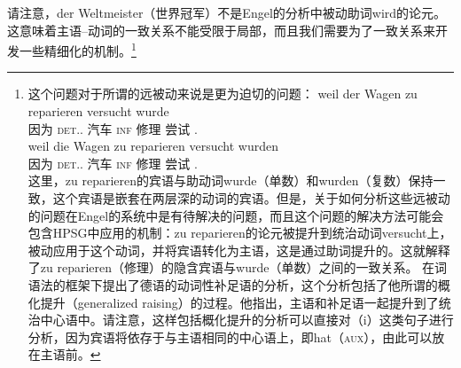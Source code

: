请注意，der Weltmeister（世界冠军）不是Engel的分析中被动助词wird的论元。这意味着主语--动词的一致关系不能受限于局部，而且我们需要为了一致关系来开发一些精细化的机制。\footnote{%
这个问题对于所谓的远被动来说是更为迫切的问题：
\eal
\ex
\gll weil der Wagen zu reparieren versucht wurde\\
     因为 \textsc{det}.\sg.\nom{} 汽车 \textsc{inf} 修理 尝试 \passivepst.\sg\\
\ex
\gll weil die Wagen zu reparieren versucht wurden\\
     因为 \textsc{det}.\pl.\nom{} 汽车 \textsc{inf} 修理 尝试 \passivepst.\pl\\
\zl
这里，zu reparieren的宾语与助动词wurde（单数）和wurden（复数）保持一致，这个宾语是嵌套在两层深的动词的宾语。但是，关于如何分析这些远被动的问题在Engel的系统中是有待解决的问题，而且这个问题的解决方法可能会包含HPSG中应用的机制：zu reparieren的论元被提升到统治动词versucht上，被动应用于这个动词，并将宾语转化为主语，这是通过助词提升的。这就解释了zu reparieren（修理）的隐含宾语与wurde（单数）之间的一致关系。 \citet{Hudson97a}在词语法的框架下提出了德语的动词性补足语的分析，这个分析包括了他所谓的概化提升（generalized raising）的过程。他指出，主语和补足语一起提升到了统治中心语中。请注意，这样包括概化提升的分析可以直接对（i）这类句子进行分析，因为宾语将依存于与主语相同的中心语上，即hat（\textsc{aux}），由此可以放在主语前。
}
